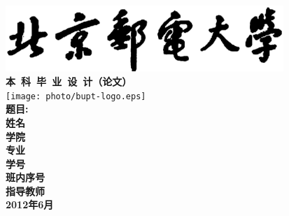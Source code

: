 \begin{titlepage}
  \thispagestyle{empty}
  \begin{center}
    \includegraphics[height=2.5cm]{photo/bupt.eps}\\
      \vspace*{15mm}
    {\bf\heiti 本~科~毕~业~设~计（论文）}\\
    \vspace*{15mm}
    \texttt{[image: photo/bupt-logo.eps]}\\
    \vspace*{15mm}
    {\bf\heiti 题目:~\uline{}}\\
    \vspace*{20mm}
    {\bf\songti
      \hspace*{-26mm}
      姓\qquad 名~\uline{}\\
      \vspace*{1em}\hspace*{-26mm}
      学\qquad 院~\uline{}\\
      \vspace*{1em}\hspace*{-26mm}
      专\qquad 业~\uline{}\\
      \vspace*{1em}\hspace*{-26mm}
      学\qquad 号~\uline{\makebox[60mm]{\hfil 08210997 \hfil}}\\
      \vspace*{1em}\hspace*{-26mm}
      班内序号~\uline{}\\
      \vspace*{1em}\hspace*{-26mm}
      指导教师~\uline{}\\
      \vspace*{20mm}
      {2012年\qquad 6月}
    }
  \end{center}
\end{titlepage} 